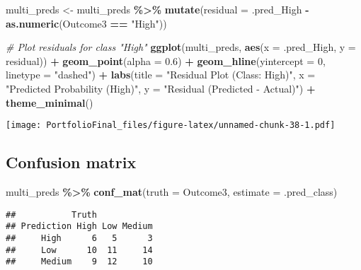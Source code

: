 \documentclass[
]{article}
\newenvironment{Shaded}{\begin{snugshade}}{\end{snugshade}}
\newcommand{\AttributeTok}[1]{\textcolor[rgb]{0.13,0.29,0.53}{#1}}
\newcommand{\CommentTok}[1]{\textcolor[rgb]{0.56,0.35,0.01}{\textit{#1}}}
\newcommand{\DecValTok}[1]{\textcolor[rgb]{0.00,0.00,0.81}{#1}}
\newcommand{\FloatTok}[1]{\textcolor[rgb]{0.00,0.00,0.81}{#1}}
\newcommand{\FunctionTok}[1]{\textcolor[rgb]{0.13,0.29,0.53}{\textbf{#1}}}
\newcommand{\NormalTok}[1]{#1}
\newcommand{\OtherTok}[1]{\textcolor[rgb]{0.56,0.35,0.01}{#1}}
\newcommand{\SpecialCharTok}[1]{\textcolor[rgb]{0.81,0.36,0.00}{\textbf{#1}}}
\newcommand{\StringTok}[1]{\textcolor[rgb]{0.31,0.60,0.02}{#1}}
\begin{document}
\begin{Shaded}
\begin{Highlighting}[]
\NormalTok{multi\_preds }\OtherTok{\textless{}{-}}\NormalTok{ multi\_preds }\SpecialCharTok{\%\textgreater{}\%}
  \FunctionTok{mutate}\NormalTok{(}\AttributeTok{residual =}\NormalTok{ .pred\_High }\SpecialCharTok{{-}} \FunctionTok{as.numeric}\NormalTok{(Outcome3 }\SpecialCharTok{==} \StringTok{"High"}\NormalTok{))}

\CommentTok{\# Plot residuals for class "High"}
\FunctionTok{ggplot}\NormalTok{(multi\_preds, }\FunctionTok{aes}\NormalTok{(}\AttributeTok{x =}\NormalTok{ .pred\_High, }\AttributeTok{y =}\NormalTok{ residual)) }\SpecialCharTok{+}
  \FunctionTok{geom\_point}\NormalTok{(}\AttributeTok{alpha =} \FloatTok{0.6}\NormalTok{) }\SpecialCharTok{+}
  \FunctionTok{geom\_hline}\NormalTok{(}\AttributeTok{yintercept =} \DecValTok{0}\NormalTok{, }\AttributeTok{linetype =} \StringTok{"dashed"}\NormalTok{) }\SpecialCharTok{+}
  \FunctionTok{labs}\NormalTok{(}\AttributeTok{title =} \StringTok{"Residual Plot (Class: High)"}\NormalTok{,}
       \AttributeTok{x =} \StringTok{"Predicted Probability (High)"}\NormalTok{,}
       \AttributeTok{y =} \StringTok{"Residual (Predicted {-} Actual)"}\NormalTok{) }\SpecialCharTok{+}
  \FunctionTok{theme\_minimal}\NormalTok{()}
\end{Highlighting}
\end{Shaded}

\texttt{[image: PortfolioFinal\_files/figure-latex/unnamed-chunk-38-1.pdf]}

\subsection{Confusion matrix}\label{confusion-matrix-1}

\begin{Shaded}
\begin{Highlighting}[]
\NormalTok{multi\_preds }\SpecialCharTok{\%\textgreater{}\%}
  \FunctionTok{conf\_mat}\NormalTok{(}\AttributeTok{truth =}\NormalTok{ Outcome3, }\AttributeTok{estimate =}\NormalTok{ .pred\_class)}
\end{Highlighting}
\end{Shaded}

\begin{verbatim}
##           Truth
## Prediction High Low Medium
##     High      6   5      3
##     Low      10  11     14
##     Medium    9  12     10
\end{verbatim}
\end{document}
